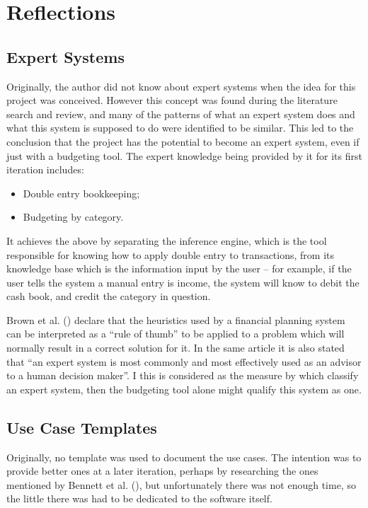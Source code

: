 \section{Reflections} \label{sec:Reflections}

\subsection{Expert Systems} \label{sec:Reflections.ExpertSystems}
Originally, the author did not know about expert systems when the idea for this
project was conceived. However this concept was found during the literature
search and review, and many of the patterns of what an expert system does and
what this system is supposed to do were identified to be similar. This led to
the conclusion that the project has the potential to become an expert system,
even if just with a budgeting tool. The expert knowledge being provided by it
for its first iteration includes:
\begin{itemize}
  \item
    Double entry bookkeeping;

  \item
    Budgeting by category.
\end{itemize}

It achieves the above by separating the inference engine, which is the tool
responsible for knowing how to apply double entry to transactions, from its
knowledge base which is the information input by the user -- for example, if
the user tells the system a manual entry is income, the system will know to
debit the cash book, and credit the category in question.

Brown et al. (\citeyear{brown1990expert}) declare that the heuristics used by a
financial planning system can be interpreted as a ``rule of thumb'' to be
applied to a problem which will normally result in a correct solution for it.
In the same article it is also stated that ``an expert system is most commonly
and most effectively used as an advisor to a human decision maker''. I this is
considered as the measure by which classify an expert system, then the
budgeting tool alone might qualify this system as one.

\subsection{Use Case Templates} \label{sec:Reflections.UseCaseTemplates}
Originally, no template was used to document the use cases. The intention was
to provide better ones at a later iteration, perhaps by researching the ones
mentioned by Bennett et al. (\citeyear[][p.~157]{bennett2010object}), but
unfortunately there was not enough time, so the little there was had to be
dedicated to the software itself.

